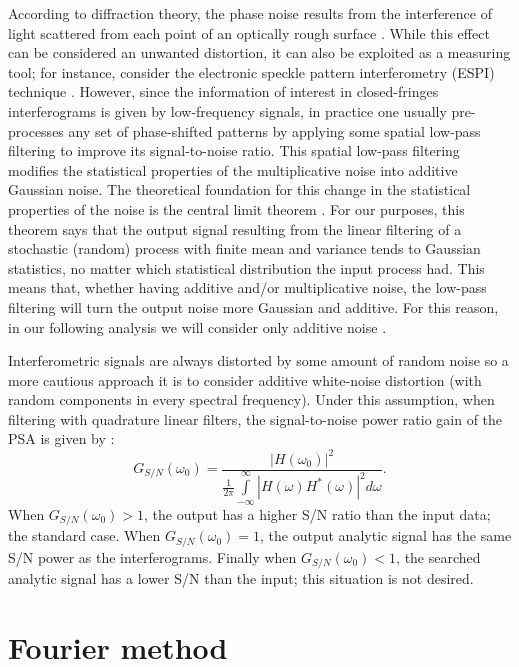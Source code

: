 According to diffraction theory, the phase noise results from the
interference of light scattered from each point of an optically rough surface 
\cite{Gasvik:2002}. While this effect can be considered an unwanted distortion, 
it can also be exploited as a measuring tool; for instance, consider the 
electronic speckle pattern interferometry (ESPI) technique \cite{Gasvik:2002}.
However, since the information of interest in closed-fringes interferograms is 
given by low-frequency signals, in
practice one usually pre-processes any set of phase-shifted patterns by applying
some spatial low-pass filtering to improve its signal-to-noise ratio. This spatial
low-pass filtering modifies the statistical properties of the multiplicative noise
into additive Gaussian noise. The theoretical foundation for this change in the
statistical properties of the noise is the central limit theorem 
\cite{Papoulis:2002}. For our
purposes, this theorem says that the output signal resulting from the linear
filtering of a stochastic (random) process with finite mean and variance tends
to Gaussian statistics, no matter which statistical distribution the input process
had. This means that, whether having additive and/or multiplicative noise, the
low-pass filtering will turn the output noise more Gaussian and additive. For
this reason, in our following analysis we will consider only additive noise
\cite{Servin:11,Surrel:97}.

Interferometric signals are always distorted by some amount of random
noise so a more cautious approach it is to consider additive white-noise 
distortion (with random components in every spectral frequency). Under this 
assumption, when filtering with quadrature linear filters, the signal-to-noise 
power ratio gain of the PSA is given by \cite{Servin:09}:
\begin{equation}
 G_{S/N}(\omega_0)=\frac{|H(\omega_0)|^2}{\frac{1}{2\pi}\int\limits_{-\infty}
^{\infty} |H(\omega)H^*(\omega)|^2 d\omega}.
\end{equation}
When $G_{S/N}(\omega_0)>1$, the output has a higher S/N ratio than the input data;
the standard case. When $G_{S/N}(\omega_0)=1$, the output analytic signal has 
the same S/N power as the interferograms. Finally when $G_{S/N}(\omega_0)<1$, the 
searched analytic signal has a lower S/N than the input; this situation is not 
desired.

\section{Fourier method}


